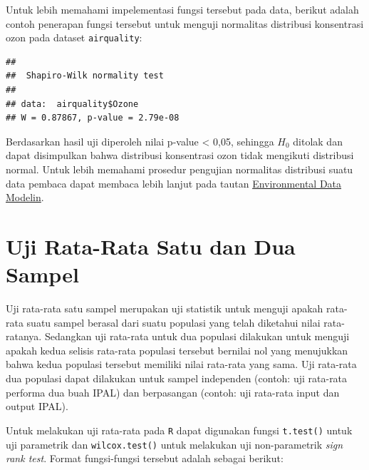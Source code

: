 \documentclass[]{book}
\newenvironment{Shaded}{\begin{snugshade}}{\end{snugshade}}
\newcommand{\KeywordTok}[1]{\textcolor[rgb]{0.13,0.29,0.53}{\textbf{#1}}}
\newcommand{\NormalTok}[1]{#1}
\newcommand{\OperatorTok}[1]{\textcolor[rgb]{0.81,0.36,0.00}{\textbf{#1}}}
\theoremstyle{definition}
\theoremstyle{definition}
\theoremstyle{definition}
\theoremstyle{remark}
\begin{document}
Untuk lebih memahami impelementasi fungsi tersebut pada data, berikut adalah contoh penerapan fungsi tersebut untuk menguji normalitas distribusi konsentrasi ozon pada dataset \texttt{airquality}:

\begin{Shaded}
\end{Shaded}

\begin{verbatim}
## 
##  Shapiro-Wilk normality test
## 
## data:  airquality$Ozone
## W = 0.87867, p-value = 2.79e-08
\end{verbatim}

Berdasarkan hasil uji diperoleh nilai p-value \textless{} 0,05, sehingga \(H_0\) ditolak dan dapat disimpulkan bahwa distribusi konsentrasi ozon tidak mengikuti distribusi normal. Untuk lebih memahami prosedur pengujian normalitas distribusi suatu data pembaca dapat membaca lebih lanjut pada tautan \href{https://environmental-data-modeling.netlify.com/tutorial/11_uji_hipotesis/\#11-4-uji-asumsi-normalitas-distribusi-data}{Environmental Data Modelin}.

\hypertarget{uji-rata-rata-satu-dan-dua-sampel}{%
\section{Uji Rata-Rata Satu dan Dua Sampel}\label{uji-rata-rata-satu-dan-dua-sampel}}

Uji rata-rata satu sampel merupakan uji statistik untuk menguji apakah rata-rata suatu sampel berasal dari suatu populasi yang telah diketahui nilai rata-ratanya. Sedangkan uji rata-rata untuk dua populasi dilakukan untuk menguji apakah kedua selisis rata-rata populasi tersebut bernilai nol yang menujukkan bahwa kedua populasi tersebut memiliki nilai rata-rata yang sama. Uji rata-rata dua populasi dapat dilakukan untuk sampel independen (contoh: uji rata-rata performa dua buah IPAL) dan berpasangan (contoh: uji rata-rata input dan output IPAL).

Untuk melakukan uji rata-rata pada \texttt{R} dapat digunakan fungsi \texttt{t.test()} untuk uji parametrik dan \texttt{wilcox.test()} untuk melakukan uji non-parametrik \emph{sign rank test}. Format fungsi-fungsi tersebut adalah sebagai berikut:
\end{document}
